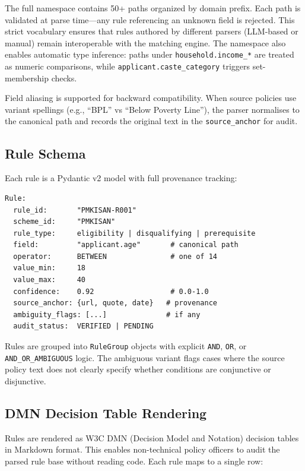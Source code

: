 \documentclass[11pt,a4paper]{article}
\newcommand{\ic}[1]{\texttt{\color{accent}#1}}
\begin{document}
The full namespace contains 50+ paths organized by domain prefix. Each path is validated at parse time---any rule referencing an unknown field is rejected. This strict vocabulary ensures that rules authored by different parsers (LLM-based or manual) remain interoperable with the matching engine. The namespace also enables automatic type inference: paths under \ic{household.income\_*} are treated as numeric comparisons, while \ic{applicant.caste\_category} triggers set-membership checks.

Field aliasing is supported for backward compatibility. When source policies use variant spellings (e.g., ``BPL'' vs ``Below Poverty Line''), the parser normalises to the canonical path and records the original text in the \ic{source\_anchor} for audit.

\subsection{Rule Schema}

\vspace{-2pt}
Each rule is a Pydantic v2 model with full provenance tracking:

\begin{lstlisting}[basicstyle=\ttfamily\footnotesize\color{codefg}, frame=none, xleftmargin=1em]
Rule:
  rule_id:       "PMKISAN-R001"
  scheme_id:     "PMKISAN"
  rule_type:     eligibility | disqualifying | prerequisite
  field:         "applicant.age"       # canonical path
  operator:      BETWEEN               # one of 14
  value_min:     18
  value_max:     40
  confidence:    0.92                  # 0.0-1.0
  source_anchor: {url, quote, date}   # provenance
  ambiguity_flags: [...]              # if any
  audit_status:  VERIFIED | PENDING
\end{lstlisting}

Rules are grouped into \ic{RuleGroup} objects with explicit \ic{AND}, \ic{OR}, or \ic{AND\_OR\_AMBIGUOUS} logic. The ambiguous variant flags cases where the source policy text does not clearly specify whether conditions are conjunctive or disjunctive.

\subsection{DMN Decision Table Rendering}

Rules are rendered as W3C DMN (Decision Model and Notation) decision tables in Markdown format. This enables non-technical policy officers to audit the parsed rule base without reading code. Each rule maps to a single row:
\end{document}
